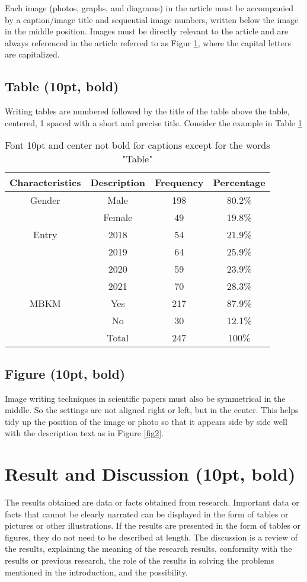 \documentclass{article}
\begin{document}
Each image (photos, graphs, and diagrams) in the article must be accompanied by a caption/image title and sequential image numbers, written below the image in the middle position. Images must be directly relevant to the article and are always referenced in the article referred to as Figur \ref{table1}, where the capital letters are capitalized.

\subsection{Table (10pt, bold)}
Writing tables are numbered followed by the title of the table above the table, centered, 1 spaced with a short and precise title. Consider the example in Table \ref{table1}
\begin{table}[h]
	\centering
	\caption{Font 10pt and center not bold for captions except for the words "Table"}
	\label{table1}
	\begin{tabular}{@{}cccc@{}}
		\toprule
		\textbf{Characteristics}& \textbf{Description }& \textbf{Frequency }& \textbf{Percentage} \\
		\midrule
		Gender & Male & 198 & 80.2\% \\
		& Female & 49 & 19.8\% \\
		Entry & 2018 & 54 & 21.9\% \\
		& 2019 & 64 & 25.9\% \\
		& 2020 & 59 & 23.9\% \\
		& 2021 & 70 & 28.3\% \\
		MBKM & Yes & 217 & 87.9\% \\
		& No & 30 & 12.1\% \\
		& Total & 247 & 100\% \\
		\bottomrule
	\end{tabular}
\end{table}


\subsection{Figure (10pt, bold)}
Image writing techniques in scientific papers must also be symmetrical in the middle. So the settings are not aligned right or left, but in the center. This helps tidy up the position of the image or photo so that it appears side by side well with the description text as in Figure \ref{fig2}.


\section{Result and Discussion (10pt, bold)}
The results obtained are data or facts obtained from research. Important data or facts that cannot be clearly narrated can be displayed in the form of tables or pictures or other illustrations. If the results are presented in the form of tables or figures, they do not need to be described at length. The discussion is a review of the results, explaining the meaning of the research results, conformity with the results or previous research, the role of the results in solving the problems mentioned in the introduction, and the possibility.
\end{document}
